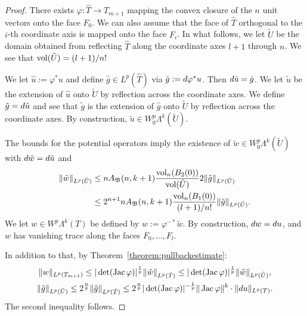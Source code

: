 \documentclass[10pt,letterpaper]{article}
\begin{document}
\begin{proof}
    There exists $\varphi : \hat T \rightarrow T_{m+1}$ mapping the convex closure of the $n$ unit vectors onto the face $F_0$.
    We can also assume that the face of $\hat T$
    orthogonal to the $i$-th coordinate axis is mapped 
    onto the face $F_i$. 
    In what follows, we let $\tilde U$ be the domain obtained from reflecting $\hat T$ along the coordinate axes $l+1$ through $n$. 
    We see that $\operatorname{vol}(\tilde U) = (l+1)/n!$
    
    
    We let $\hat u := \varphi^{\ast} u$ and define $\hat g \in L^{p}(\hat T)$ via $\hat g := d \varphi^{\ast} u$. 
    Then $d \hat u = \hat g$. 
    We let $\tilde u$ be the extension of $\hat u$ onto $\tilde U$ by reflection across the coordinate axes.
    We define $\tilde g = d \tilde u$
    and see that $\tilde g$ is the extension of $\hat g$ onto $\tilde U$ by reflection across the coordinate axes. 
    By construction, $\tilde u \in W^{p}_{0}\Lambda^{k}(\tilde U)$.
    
    The bounds for the potential operators imply 
    the existence of $\tilde w \in W^{p}_{0}\Lambda^{k}(\tilde U)$
    with $d \tilde w = d \tilde u$ and 
    \begin{align*}
        \| \tilde w \|_{L^{p}(\tilde U)}
        &\leq 
        n A_{{\mathfrak B}}(n,k+1) \frac{ \operatorname{vol}_{n}(B_2(0)) }{ \operatorname{vol}(\tilde U) } 
        2
        \| \tilde g \|_{L^{p}(\tilde U)}
        \\&\leq 
        2^{n+1} n A_{{\mathfrak B}}(n,k+1) \frac{ \operatorname{vol}_{n}(B_1(0)) }{ (l+1)/n! } 
        \| \tilde g \|_{L^{p}(\tilde U)}
        .
    \end{align*}
    We let $w \in W^{p}\Lambda^{k}(T)$ be defined by $w := \varphi^{-\ast} \tilde w$.
    By construction, $d w = d u$,
    and $w$ has vanishing trace along the faces $F_{0},\dots,F_{l}$.
    
    In addition to that, by Theorem~\ref{theorem:pullbackestimate}:
    \begin{gather*}
        \| w \|_{L^{p}(T_{m+1})}
        \leq 
        |\det(\operatorname{{\rm Jac}} \varphi)|^{\frac 1 p} 
        \| \tilde w \|_{L^{p}(\hat T)}
        \leq 
        |\det(\operatorname{{\rm Jac}} \varphi)|^{\frac 1 p} 
        \| \tilde w \|_{L^{p}(\tilde U)}
        ,
        \\
        \| \tilde g \|_{L^{p}(\tilde U)}
        \leq 
        2^{\frac n p}
        \| \hat g \|_{L^{p}(\hat T)}
        \leq 
        2^{\frac n p}
        |\det( \operatorname{{\rm Jac}} \varphi )|^{-\frac 1 p} 
        \| \operatorname{{\rm Jac}} \varphi \|^{k}
        \cdot 
        \| d u \|_{L^{p}(T)}
        .
    \end{gather*}
    The second inequality follows.
\end{proof}
\end{document}
